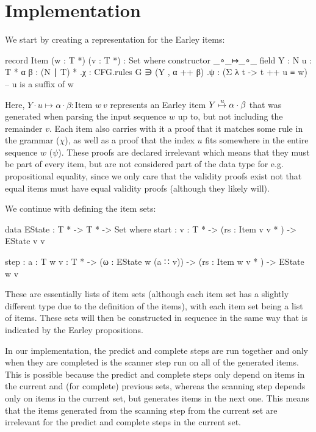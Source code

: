 	\section{Implementation}

		We start by creating a representation for the Earley items:

		\begin{code}
			record Item (w : T *) (v : T *) : Set where
			  constructor _∘_↦_∘_
			  field
			    Y : N
			    u : T *
			    α β : (N ∣ T) *
			    .{χ} : CFG.rules G ∋ (Y , α ++ β)
			    .{ψ} : (Σ λ t -> t ++ u ≡ w)        -- u is a suffix of w
		\end{code}

		Here, $Y \cdot u \mapsto \alpha \cdot \beta : \textrm{Item } w\ v$
		represents an Earley item $Y\overset{u}{\mapsto}\alpha\cdot\beta$ that was
		generated when parsing the input sequence $w$ up to, but not including
		the remainder $v$. Each item also carries with it a proof that it
		matches some rule in the grammar ($\chi$), as well as a proof that the
		index $u$ fits somewhere in the entire sequence $w$ ($\psi$). These
		proofs are declared irrelevant which means that they must be part of
		every item, but are not considered part of the data type for e.g.
		propositional equality, since we only care that the validity proofs
		exist not that equal items must have equal validity proofs (although
		they likely will).

		We continue with defining the item sets:

		\begin{code}
			data EState : T * -> T * -> Set where
			  start : {v : T *} ->
			    (rs : Item v v * ) ->
			    EState v v

			  step : {a : T} {w v : T *} ->
			    (ω : EState w (a ∷ v)) ->
			    (rs : Item w v * ) ->
			    EState w v
		\end{code}

		These are essentially lists of item sets (although each item set has a
		slightly different type due to the definition of the items), with each
		item set being a list of items. These sets will then be constructed in
		sequence in the same way that is indicated by the Earley propositions.

		In our implementation, the predict and complete steps are run together
		and only when they are completed is the scanner step run on all of the
		generated items. This is possible because the predict and complete
		steps only depend on items in the current and (for complete) previous
		sets, whereas the scanning step depends only on items in the current
		set, but generates items in the next one. This means that the items
		generated from the scanning step from the current set are irrelevant
		for the predict and complete steps in the current set.

